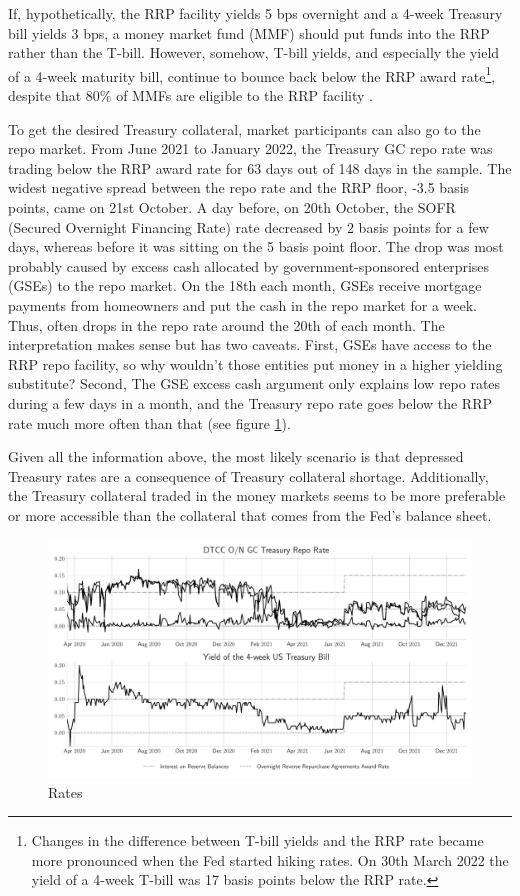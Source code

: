 \documentclass[11pt,a4paper,english,oneside]{article}
\begin{document}
If, hypothetically, the RRP facility yields 5 bps overnight and a 4-week Treasury bill yields 3 bps, a money market fund (MMF) should put funds into the RRP rather than the T-bill. However, somehow, T-bill yields, and especially the yield of a 4-week maturity bill, continue to bounce back below the RRP award rate\footnote{Changes in the difference between T-bill yields and the RRP rate became more pronounced when the Fed started hiking rates. On 30th March 2022 the yield of a 4-week T-bill was 17 basis points below the RRP rate.}, despite that 80\% of MMFs are eligible to the RRP facility \citet{cipriani2022}.

To get the desired Treasury collateral, market participants can also go to the repo market. From June 2021 to January 2022, the Treasury GC repo rate was trading below the RRP award rate for 63 days out of 148 days in the sample. The widest negative spread between the repo rate and the RRP floor, -3.5 basis points, came on 21st October. A day before, on 20th October, the SOFR (Secured Overnight Financing Rate) rate decreased by 2 basis points for a few days, whereas before it was sitting on the 5 basis point floor. The drop was most probably caused by excess cash allocated by government-sponsored enterprises (GSEs) to the repo market. On the 18th each month, GSEs receive mortgage payments from homeowners and put the cash in the repo market for a week\citet{reuters2021}. Thus, often drops in the repo rate around the 20th of each month. The interpretation makes sense but has two caveats. First, GSEs have access to the RRP repo facility, so why wouldn't those entities put money in a higher yielding substitute? Second, The GSE excess cash argument only explains low repo rates during a few days in a month, and the Treasury repo rate goes below the RRP rate much more often than that (see figure \ref{fig:rates}).

Given all the information above, the most likely scenario is that depressed Treasury rates are a consequence of Treasury collateral shortage. Additionally, the Treasury collateral traded in the money markets seems to be more preferable or more accessible than the collateral that comes from the Fed's balance sheet.

\begin{figure}[htb!]
  \begin{center}
    \caption{Rates}
    \includegraphics[width=0.99\linewidth]{rates.pdf}
  \end{center}
  \label{fig:rates}
\end{figure}
\end{document}
